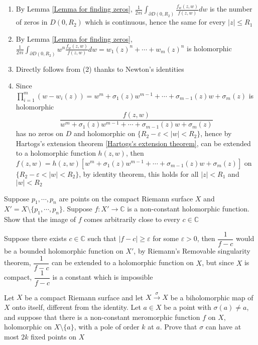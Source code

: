 \documentclass[main]{subfiles}
\begin{document}
\begin{solution}
\begin{enumerate}[label=\textbf{\arabic*.}, leftmargin=*]
\item By Lemma \ref{Lemma for finding zeros}, $\displaystyle\frac{1}{2\pi i}\int_{\partial D(0,R_2)}\frac{f_w(z,w)}{f(z,w)}dw$ is the number of zeros in $D(0,R_2)$ which is continuous, hence the same for every $|z|\leq R_1$
\item By Lemma \ref{Lemma for finding zeros}, $\displaystyle\frac{1}{2\pi i}\int_{\partial D(0,R_2)}w^n\frac{f_w(z,w)}{f(z,w)}dw=w_1(z)^n+\cdots+w_m(z)^n$ is holomorphic
\item Directly follows from (2) thanks to Newton's identities
\item Since $\displaystyle\prod_{i=1}^m(w-w_i(z))=w^m+\sigma_1(z)w^{m-1}+\cdots+\sigma_{m-1}(z)w+\sigma_m(z)$ is holomorphic
\[\dfrac{f(z,w)}{w^m+\sigma_1(z)w^{m-1}+\cdots+\sigma_{m-1}(z)w+\sigma_m(z)}\]
has no zeros on $D$ and holomorphic on $\{R_2-\varepsilon<|w|<R_2\}$, hence by Hartogs's extension theorem \ref{Hartogs's extension theorem}, can be extended to a holomorphic function $h(z,w)$, then $f(z,w)=h(z,w)[w^m+\sigma_1(z)w^{m-1}+\cdots+\sigma_{m-1}(z)w+\sigma_m(z)]$ on $\{R_2-\varepsilon<|w|<R_2\}$, by identity theorem, this holds for all $|z|<R_1$ and $|w|<R_2$
\end{enumerate}
\end{solution}

\begin{exercise}
Suppose $p_1,\cdots,p_n$ are points on the compact Riemann surface $X$ and $X'=X\setminus\{p_1,\cdots, p_n\}$. Suppose $f:X'\to\mathbb C$ is a non-constant holomorphic function. Show that the image of $f$ comes arbitrarily close to every $c\in\mathbb C$
\end{exercise}

\begin{solution}
Suppose there exists $c\in\mathbb C$ such that $|f-c|\geq\varepsilon$ for some $\varepsilon>0$, then $\dfrac{1}{f-c}$ would be a bounded holomorphic function on $X'$, by Riemann's Removable singularity theorem, $\dfrac{1}{f-c}$ can be extended to a holomorphic function on $X$, but since $X$ is compact, $\dfrac{1}{f-c}$ is a constant which is impossible
\end{solution}

\begin{exercise}
Let $X$ be a compact Riemann surface and let $X\xrightarrow\sigma X$ be a biholomorphic map of $X$ onto itself, different from the identity. Let $a\in X$ be a point with $\sigma(a)\neq a$, and suppose that there is a non-constant meromorphic function $f$ on $X$, holomorphic on $X\setminus\{a\}$, with a pole of order $k$ at $a$. Prove that $\sigma$ can have at most $2k$ fixed points on $X$
\end{exercise}
\end{document}
